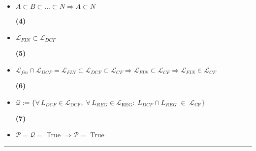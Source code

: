 \begin{tcolorbox}[colback=yellow!15!white, colframe=blue!50!white,
	fonttitle=\bfseries\Large, title = Απόδειξη]
\begin{itemize}
	\item $A \subset B \subset...\subset N \Rightarrow A \subset N$
	\reducevspace\reducevspace\reducevspace\reducevspace\reducevspace\reducevspace\reducevspace
	\reducevspace\reducevspace\reducevspace\reducevspace\reducevspace\reducevspace\reducevspace
	\reducevspace\reducevspace\reducevspace\reducevspace\reducevspace\reducevspace\reducevspace
	\begin{flushright}\hypertarget{3.1.4}{\bf{(4)}}\end{flushright}

	\item $\mathcal{L}_{FIN} \subset \mathcal{L}_{DCF}$
	\reducevspace\reducevspace\reducevspace\reducevspace\reducevspace\reducevspace\reducevspace
	\reducevspace\reducevspace\reducevspace\reducevspace\reducevspace\reducevspace\reducevspace
	\reducevspace\reducevspace\reducevspace\reducevspace\reducevspace\reducevspace\reducevspace
	\begin{flushright}\hypertarget{3.1.5}{\bf{(5)}}\end{flushright}

	\item $\mathcal{L}_{fin} \cap \mathcal{L}_{DCF} = \mathcal{L}_{FIN} \subset \mathcal{L}_{DCF} \subset
	\mathcal{L}_{CF} \Rightarrow \mathcal{L}_{FIN} \subset \mathcal{L}_{CF} \Rightarrow \mathcal{L}_{FIN}
	\in \mathcal{L}_{CF}$
	\reducevspace\reducevspace\reducevspace\reducevspace\reducevspace\reducevspace\reducevspace
	\reducevspace\reducevspace\reducevspace\reducevspace\reducevspace\reducevspace\reducevspace
	\reducevspace\reducevspace\reducevspace\reducevspace\reducevspace\reducevspace\reducevspace
	\begin{flushright}\hypertarget{3.1.6}{\bf{(6)}}\end{flushright}

	\item $\mathcal{Q} := \{\forall\,L_{DCF}\in\mathcal L_{\mathrm{DCF}},\;\forall\,L_{REG}\in\mathcal
	L_{\mathrm{REG}}:\;L_{DCF}\cap L_{REG}\;\in\;\mathcal L_{\mathrm{CF}}\}$
	\reducevspace\reducevspace\reducevspace\reducevspace\reducevspace\reducevspace\reducevspace
	\reducevspace\reducevspace\reducevspace\reducevspace\reducevspace\reducevspace\reducevspace
	\reducevspace\reducevspace\reducevspace\reducevspace\reducevspace\reducevspace\reducevspace
	\begin{flushright}\hypertarget{3.1.7}{\bf{(7)}}\end{flushright}

	\item $\mathcal{P} = \mathcal{Q} = $ True $ \Rightarrow \mathcal{P} = $ True
\end{itemize}
\end{tcolorbox}

\begin{center}
	\noindent\rule{\linewidth}{0.5pt}
\end{center}
\clearpage